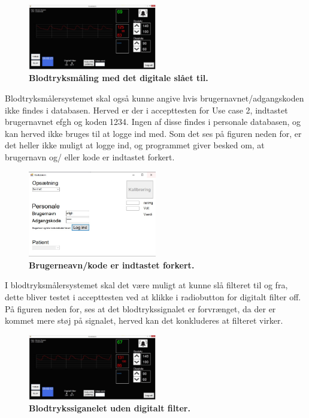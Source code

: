 \begin{figure}[H]
\includegraphics[width =0.5\textwidth , center]{billeder/IThovedGUIkorer}
\caption{\textbf{Blodtryksmåling med det digitale slået til.}}
\end{figure}
Blodtryksmålersystemet skal også kunne angive hvis brugernavnet/adgangskoden ikke findes i databasen. Herved er der i accepttesten for Use case 2, indtastet brugernavnet efgh og koden 1234. Ingen af disse findes i personale databasen, og kan herved ikke bruges til at logge ind med. Som det ses på figuren neden for, er det heller ikke muligt at logge ind, og programmet giver besked om, at brugernavn og/ eller kode er indtastet forkert.
\begin{figure}[H]
\includegraphics[width =0.5\textwidth , center]{billeder/ITstartGUIforkert}
\caption{\textbf{Brugerneavn/kode er indtastet forkert.}}
\end{figure}
I blodtryksmålersystemet skal det være muligt at kunne slå filteret til og fra, dette bliver testet i accepttesten ved at klikke i radiobutton for digitalt filter off. På figuren neden for, ses at det blodtrykssignalet er forvrænget, da der er kommet mere støj på signalet, herved kan det konkluderes at filteret virker. 
\begin{figure}[H]
\includegraphics[width =0.5\textwidth , center]{billeder/IThovedGUIkorerufiltreret}
\caption{\textbf{Blodtrykssiganelet uden digitalt filter.}}
\end{figure}
